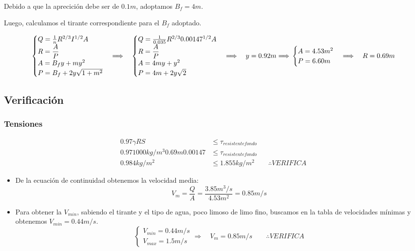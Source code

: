 \documentclass[10.5pt]{article}
\begin{document}
Debido a que la aprecición debe ser de $0.1 m$, adoptamos $B_{f} = 4 m$.

Luego, calculamos el tirante correspondiente para el $B_{f}$ adoptado.

\begin{equation*}
  \begin{cases}
    Q = \frac{1}{n} R^{2/3} I^{1/2} A \\
    R = \dfrac{A}{P} \\
    A = B_{f}y + m y^{2} \\
    P = B_{f} + 2 y \sqrt{1 + m^{2}}
  \end{cases}
  \Longrightarrow \quad
  \begin{cases}
    Q = \frac{1}{0.035} R^{2/3} 0.00147^{1/2} A \\
    R = \dfrac{A}{P} \\
    A = 4 m y + y^2 \\
    P = 4 m + 2 y \sqrt{2}
  \end{cases}
  \Longrightarrow \quad
  y = 0.92 m
  \Longrightarrow \newline
  \begin{cases}
    A = 4.53 m^2 \\
    P = 6.60 m
  \end{cases}
  \Longrightarrow \quad
  R = 0.69 m
\end{equation*}


\subsection*{Verificación}

\subsubsection*{Tensiones}

\begin{align*}
 0.97 \gamma R S &\leq \tau_{resistente fondo} \\
 0.97 1000 kg/m^3 0.69 m 0.00147 &\leq \tau_{resistente fondo} \\
 0.984 kg/m^2 &\leq 1.855 kg/m^2
 \qquad
 \therefore VERIFICA 
\end{align*}

\begin{itemize}
 \item De la ecuación de continuidad obtenemos la velocidad media:
    \begin{equation*}
    V_{m} = \dfrac{Q}{A} = \dfrac{3.85 m^3/s}{4.53 m^2} = 0.85 m/s
    \end{equation*}
 \item Para obtener la $V_{min}$, sabiendo el tirante y el tipo de agua, poco limoso de limo fino, buscamos en
 la tabla de velocidades mínimas y obtenemos $V_{min} = 0.44 m/s$.
    \begin{equation*}
      \begin{cases}
      V_{min} = 0.44 m/s \\
      V_{max} = 1.5 m/s
      \end{cases}
      \Longrightarrow \quad
      V_{m} = 0.85 m/s
      \qquad
      \therefore VERIFICA
    \end{equation*}
\end{itemize}
\end{document}
